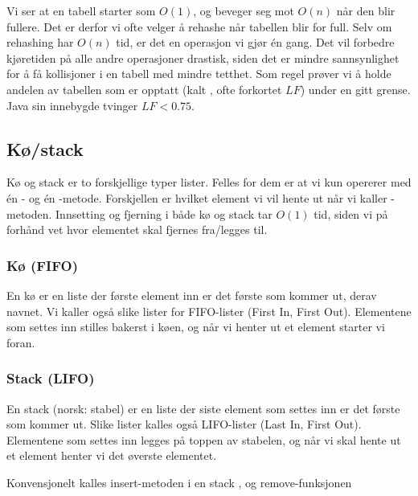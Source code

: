 Vi ser at en tabell starter som $ O(1) $, og beveger seg mot $ O(n) $ når den blir fullere. Det er derfor vi ofte velger å rehashe når tabellen blir for full. Selv om rehashing har $ O(n) $ tid, er det en operasjon vi gjør én gang. Det vil forbedre kjøretiden på alle andre operasjoner drastisk, siden det er mindre sannsynlighet for å få kollisjoner i en tabell med mindre tetthet. Som regel prøver vi å holde andelen av tabellen som er opptatt (kalt , ofte forkortet $ LF $) under en gitt grense. Java sin innebygde  tvinger $ LF < 0.75 $.





\subsection{Kø/stack} \label{ko_stack}
Kø og stack er to forskjellige typer lister. Felles for dem er at vi kun opererer med én - og én -metode. Forskjellen er hvilket element vi vil hente ut når vi kaller -metoden. Innsetting og fjerning i både kø og stack tar $ O(1) $ tid, siden vi på forhånd vet hvor elementet skal fjernes fra/legges til. 


\subsubsection{Kø (FIFO)}
En kø er en liste der første element inn er det første som kommer ut, derav navnet. Vi kaller også slike lister for FIFO-lister (First In, First Out). Elementene som settes inn stilles bakerst i køen, og når vi henter ut et element starter vi foran. 


\subsubsection{Stack (LIFO)}
En stack (norsk: stabel) er en liste der siste element som settes inn er det første som kommer ut. Slike lister kalles også LIFO-lister (Last In, First Out). Elementene som settes inn legges på toppen av stabelen, og når vi skal hente ut et element henter vi det øverste elementet. 

Konvensjonelt kalles insert-metoden i en stack , og remove-funksjonen 

